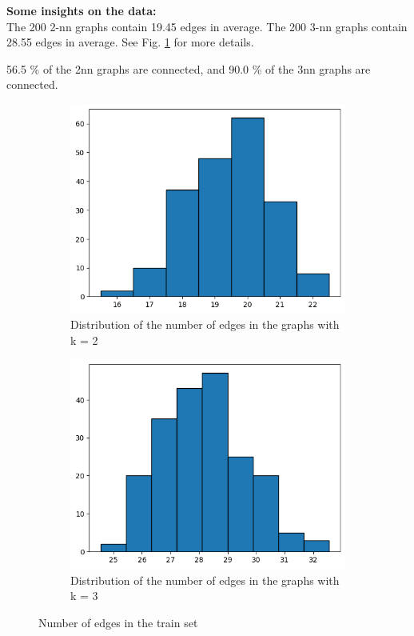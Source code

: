 \documentclass[a4paper,11pt]{article}
\begin{document}
\textbf{Some insights on the data: }\\

The 200 2-nn graphs contain 19.45 edges in average. 
The 200 3-nn graphs contain 28.55 edges in average.
See Fig. \ref{fig:hist_edges} for more details. 

56.5 \% of the 2nn graphs are connected, and 90.0 \% of the 3nn graphs are connected.


\begin{figure}
    \centering
    \begin{subfigure}{0.4\textwidth}
        \includegraphics[width=\textwidth]{figures/hist_2_nn.png}
        \caption{Distribution of the number of edges in the graphs with k = 2}
    \end{subfigure}
    \begin{subfigure}{0.4\textwidth}
        \includegraphics[width=\textwidth]{figures/hist_3_nn.png}
        \caption{Distribution of the number of edges in the graphs with k = 3}
    \end{subfigure}
    \caption{Number of edges in the train set}
    \label{fig:hist_edges}
\end{figure}
\end{document}

